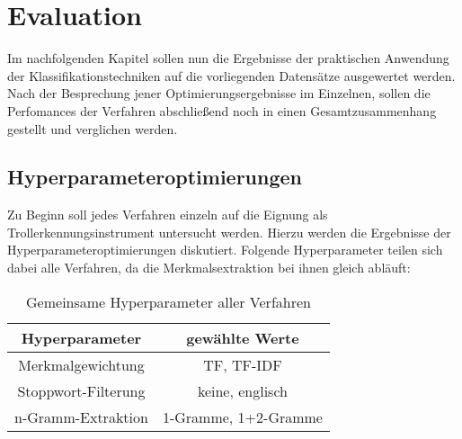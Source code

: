 \section{Evaluation}\raggedbottom
Im nachfolgenden Kapitel sollen nun die Ergebnisse der praktischen Anwendung der Klassifikationstechniken auf die vorliegenden Datensätze ausgewertet werden. Nach der Besprechung jener Optimierungsergebnisse im Einzelnen, sollen die Perfomances der Verfahren abschließend noch in einen Gesamtzusammenhang gestellt und verglichen werden.
\subsection{Hyperparameteroptimierungen}
Zu Beginn soll jedes Verfahren einzeln auf die Eignung als Trollerkennungsinstrument untersucht werden. Hierzu werden die Ergebnisse der Hyperparameteroptimierungen diskutiert. Folgende Hyperparameter teilen sich dabei alle Verfahren, da die Merkmalsextraktion bei ihnen gleich abläuft:
\begin{table}[htb]
	\begin{center}
		\begin{tabular}{|c|c|}
			\hline
			Hyperparameter & gewählte Werte \\ \hline \hline
			Merkmalgewichtung & TF, TF-IDF \\ \hline
			Stoppwort-Filterung & keine, englisch\\ \hline
			n-Gramm-Extraktion & 1-Gramme, 1+2-Gramme\\ \hline			
		\end{tabular}
		\caption{Gemeinsame Hyperparameter aller Verfahren}\label{common-params}
	\end{center}
\end{table}
